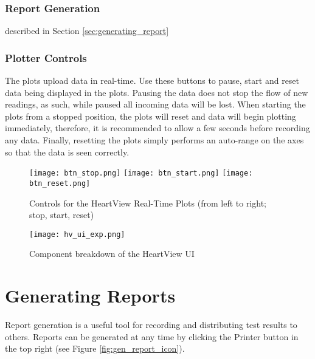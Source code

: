 \documentclass[11pt,fleqn]{book} %
\begin{document}
\subsubsection*{Report Generation} 
described in Section \ref{sec:generating_report} 

\subsubsection*{Plotter Controls}
The plots upload data in real-time. Use these buttons to pause, start and reset data being displayed in the plots. Pausing the data does not stop the flow of new readings, as such, while paused all incoming data will be lost. When starting the plots from a stopped position, the plots will reset and data will begin plotting immediately, therefore, it is recommended to allow a few seconds before recording any data. Finally, resetting the plots simply performs an auto-range on the axes so that the data is seen correctly. 


\begin{figure}[h]
	\centering\texttt{[image: btn\_stop.png]}
	\centering\texttt{[image: btn\_start.png]}
	\centering\texttt{[image: btn\_reset.png]}
	\caption{Controls for the HeartView Real-Time Plots (from left to right; stop, start, reset)}
	\label{fig:plotter_buttons} %
\end{figure}

\begin{landscape}
\begin{figure}[h]
	\centering\texttt{[image: hv\_ui\_exp.png]}
	\caption{Component breakdown of the HeartView UI}
	\label{fig:ui_overview} %
\end{figure}
\end{landscape}



\section{Generating Reports}\label{sec:generating_report}

Report generation is a useful tool for recording and distributing test results to others. Reports can be generated at any time by clicking the Printer button in the top right (see Figure \ref{fig:gen_report_icon}).
\end{document}
